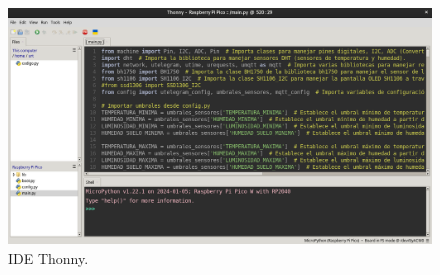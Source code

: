 \begin{figure}[h]
    \centering
    \includegraphics[width=1\textwidth]{img/herramientas/thonny.png}
    \caption{IDE Thonny.} \label{Img:Thonny}
\end{figure}
